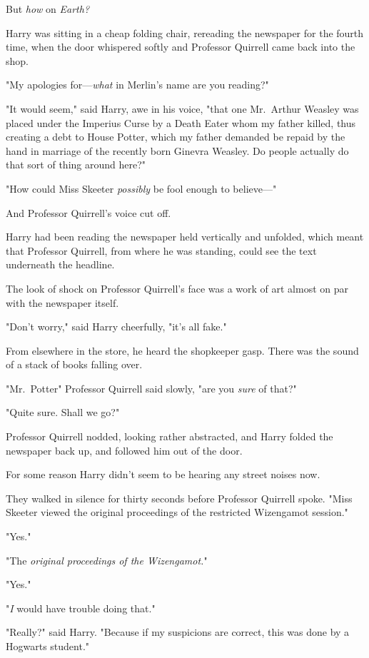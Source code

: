But \emph{how} on \emph{Earth\el\kern\ellipsisgapitalic?}

Harry was sitting in a cheap folding chair, rereading the newspaper for the
fourth time, when the door whispered softly and Professor Quirrell came back
into the shop.

"My apologies for---\emph{what} in Merlin's name are you reading?"

"It would seem," said Harry, awe in his voice, "that one Mr.~Arthur Weasley was
placed under the Imperius Curse by a Death Eater whom my father killed, thus
creating a debt to House Potter, which my father demanded be repaid by the hand
in marriage of the recently born Ginevra Weasley. Do people actually do that
sort of thing around here?"

"How could Miss Skeeter \emph{possibly} be fool enough to believe\mbox{---}"

And Professor Quirrell's voice cut off.

Harry had been reading the newspaper held vertically and unfolded, which meant
that Professor Quirrell, from where he was standing, could see the text
underneath the headline.

The look of shock on Professor Quirrell's face was a work of art almost on par
with the newspaper itself.

"Don't worry," said Harry cheerfully, "it's all fake."

From elsewhere in the store, he heard the shopkeeper gasp. There was the sound
of a stack of books falling over.

"Mr.~Potter{\el}" Professor Quirrell said slowly, "are you \emph{sure} of
that?"

"Quite sure. Shall we go?"

Professor Quirrell nodded, looking rather abstracted, and Harry folded the
newspaper back up, and followed him out of the door.

For some reason Harry didn't seem to be hearing any street noises now.

They walked in silence for thirty seconds before Professor Quirrell spoke.
"Miss Skeeter viewed the original proceedings of the restricted Wizengamot
session."

"Yes."

"The \emph{original proceedings of the Wizengamot.}"

"Yes."

"\emph{I} would have trouble doing that."

"Really?" said Harry. "Because if my suspicions are correct, this was done by a
Hogwarts student."

